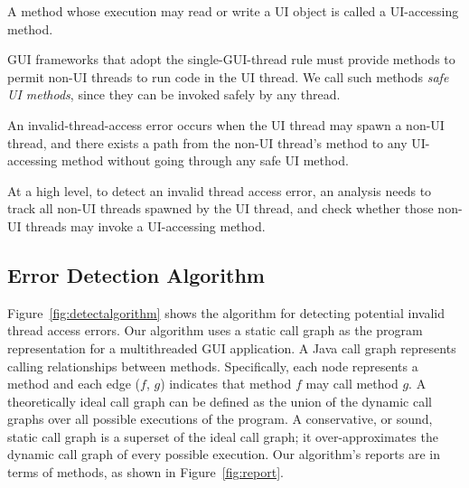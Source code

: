  { A method
whose execution may read or write a UI object is called a UI-accessing method.}\vspace{1mm}

 {GUI frameworks that
adopt the single-GUI-thread rule must provide methods to permit non-UI threads
to run code in the UI thread. We call such methods \textit{safe UI methods}, since
they can be invoked safely by any thread.}\vspace{1mm}

 {An invalid-thread-access error occurs when the UI thread may spawn a non-UI thread, and there
exists a path from the non-UI thread's  method to any UI-accessing method
without going through any safe UI method. }\vspace{1mm}


At a high level, to detect an invalid thread access error, an analysis needs to track all
non-UI threads spawned by the UI thread, and check whether those non-UI threads
may invoke a UI-accessing method.

\tinystep

\subsection{Error Detection Algorithm}
\label{sec:algorithm}

Figure~\ref{fig:detectalgorithm} shows the algorithm for detecting
potential invalid thread access errors. Our algorithm uses a
static call graph as the program representation for a multithreaded
GUI application. A Java call graph represents calling relationships
between methods. Specifically, each node represents a method and each
edge ($f$, $g$) indicates that method $f$ may call method $g$.
A theoretically ideal call graph can be defined as the union of the
dynamic call graphs over all possible executions of the program. 
A conservative, or sound, static call graph is a superset of
the ideal call graph; it over-approximates the
dynamic call graph of every possible execution. 
Our algorithm's reports are in terms of methods, as shown in Figure~\ref{fig:report}.



